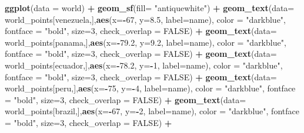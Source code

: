 \documentclass[12pt,twoside]{reedthesis}
\newenvironment{Shaded}{\begin{snugshade}}{\end{snugshade}}
\newcommand{\DataTypeTok}[1]{\textcolor[rgb]{0.13,0.29,0.53}{#1}}
\newcommand{\DecValTok}[1]{\textcolor[rgb]{0.00,0.00,0.81}{#1}}
\newcommand{\FloatTok}[1]{\textcolor[rgb]{0.00,0.00,0.81}{#1}}
\newcommand{\KeywordTok}[1]{\textcolor[rgb]{0.13,0.29,0.53}{\textbf{#1}}}
\newcommand{\NormalTok}[1]{#1}
\newcommand{\OperatorTok}[1]{\textcolor[rgb]{0.81,0.36,0.00}{\textbf{#1}}}
\newcommand{\OtherTok}[1]{\textcolor[rgb]{0.56,0.35,0.01}{#1}}
\newcommand{\StringTok}[1]{\textcolor[rgb]{0.31,0.60,0.02}{#1}}
\begin{document}
\begin{Shaded}
\begin{Highlighting}[]
\KeywordTok{ggplot}\NormalTok{(}\DataTypeTok{data =}\NormalTok{ world) }\OperatorTok{+}\StringTok{ }
\StringTok{  }\KeywordTok{geom_sf}\NormalTok{(}\DataTypeTok{fill=} \StringTok{"antiquewhite"}\NormalTok{) }\OperatorTok{+}\StringTok{ }
\StringTok{  }\KeywordTok{geom_text}\NormalTok{(}\DataTypeTok{data=}\NormalTok{ world_points[venezuela,],}\KeywordTok{aes}\NormalTok{(}\DataTypeTok{x=}\OperatorTok{-}\DecValTok{67}\NormalTok{, }\DataTypeTok{y=}\FloatTok{8.5}\NormalTok{, }\DataTypeTok{label=}\NormalTok{name), }\DataTypeTok{color =} \StringTok{"darkblue"}\NormalTok{, }\DataTypeTok{fontface =} \StringTok{"bold"}\NormalTok{, }\DataTypeTok{size=}\DecValTok{3}\NormalTok{, }\DataTypeTok{check_overlap =} \OtherTok{FALSE}\NormalTok{) }\OperatorTok{+}
\StringTok{  }\KeywordTok{geom_text}\NormalTok{(}\DataTypeTok{data=}\NormalTok{ world_points[panama,],}\KeywordTok{aes}\NormalTok{(}\DataTypeTok{x=}\OperatorTok{-}\FloatTok{79.2}\NormalTok{, }\DataTypeTok{y=}\FloatTok{9.2}\NormalTok{, }\DataTypeTok{label=}\NormalTok{name), }\DataTypeTok{color =} \StringTok{"darkblue"}\NormalTok{, }\DataTypeTok{fontface =} \StringTok{"bold"}\NormalTok{, }\DataTypeTok{size=}\DecValTok{3}\NormalTok{, }\DataTypeTok{check_overlap =} \OtherTok{FALSE}\NormalTok{) }\OperatorTok{+}\StringTok{ }
\StringTok{  }\KeywordTok{geom_text}\NormalTok{(}\DataTypeTok{data=}\NormalTok{ world_points[ecuador,],}\KeywordTok{aes}\NormalTok{(}\DataTypeTok{x=}\OperatorTok{-}\FloatTok{78.2}\NormalTok{, }\DataTypeTok{y=}\OperatorTok{-}\DecValTok{1}\NormalTok{, }\DataTypeTok{label=}\NormalTok{name), }\DataTypeTok{color =} \StringTok{"darkblue"}\NormalTok{, }\DataTypeTok{fontface =} \StringTok{"bold"}\NormalTok{, }\DataTypeTok{size=}\DecValTok{3}\NormalTok{, }\DataTypeTok{check_overlap =} \OtherTok{FALSE}\NormalTok{) }\OperatorTok{+}
\StringTok{  }\KeywordTok{geom_text}\NormalTok{(}\DataTypeTok{data=}\NormalTok{ world_points[peru,],}\KeywordTok{aes}\NormalTok{(}\DataTypeTok{x=}\OperatorTok{-}\DecValTok{75}\NormalTok{, }\DataTypeTok{y=}\OperatorTok{-}\DecValTok{4}\NormalTok{, }\DataTypeTok{label=}\NormalTok{name), }\DataTypeTok{color =} \StringTok{"darkblue"}\NormalTok{, }\DataTypeTok{fontface =} \StringTok{"bold"}\NormalTok{, }\DataTypeTok{size=}\DecValTok{3}\NormalTok{, }\DataTypeTok{check_overlap =} \OtherTok{FALSE}\NormalTok{) }\OperatorTok{+}
\StringTok{  }\KeywordTok{geom_text}\NormalTok{(}\DataTypeTok{data=}\NormalTok{ world_points[brazil,],}\KeywordTok{aes}\NormalTok{(}\DataTypeTok{x=}\OperatorTok{-}\DecValTok{67}\NormalTok{, }\DataTypeTok{y=}\OperatorTok{-}\DecValTok{2}\NormalTok{, }\DataTypeTok{label=}\NormalTok{name), }\DataTypeTok{color =} \StringTok{"darkblue"}\NormalTok{, }\DataTypeTok{fontface =} \StringTok{"bold"}\NormalTok{, }\DataTypeTok{size=}\DecValTok{3}\NormalTok{, }\DataTypeTok{check_overlap =} \OtherTok{FALSE}\NormalTok{) }\OperatorTok{+}

\end{Highlighting}
\end{Shaded}
\end{document}
